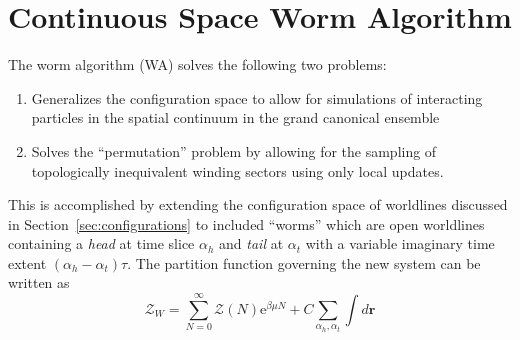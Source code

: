 \documentclass[prb,aps,amssym,nofootinbib,floatfix,notitlepage]{revtex4-1}
\renewcommand{\vec}[1]{\boldsymbol{#1}}
\newcommand{\e}[1]{\mathrm{e}^{#1}}
\begin{document}
\section{Continuous Space Worm Algorithm}

The worm algorithm \cite{Boninsegni:2006ed,Boninsegni:2006gc} (WA) solves the following two problems:
\begin{enumerate}
    \item Generalizes the configuration space to allow for simulations of
        interacting particles in the spatial continuum in the grand canonical
        ensemble
    \item Solves the ``permutation'' problem by allowing for the sampling of
        topologically inequivalent winding sectors using only local updates.
\end{enumerate}
This is accomplished by extending the configuration space of worldlines
discussed in Section~\ref{sec:configurations} to included ``worms'' which are
open worldlines containing a \emph{head} at time slice $\alpha_h $ and \emph{tail} at
$\alpha_t$ with a variable imaginary time extent $(\alpha_h -
\alpha_t)\tau$.  The partition function governing the new system can be written
as
%
\begin{equation}
    \mathcal{Z}_W = \sum_{N=0}^{\infty} \mathcal{Z}(N) \e{\beta \mu N} + C
\sum_{\alpha_h,\alpha_t} \int d\vec{r}
\end{equation}
%












\end{document}
